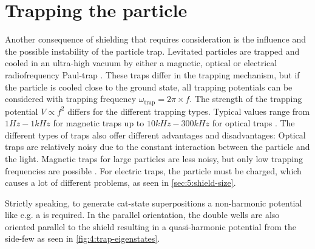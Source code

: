 \section{Trapping the particle}\label{sec:4:trapping}
Another consequence of shielding that requires consideration is the influence and the possible instability of the particle trap. Levitated particles are trapped and cooled in an ultra-high vacuum by either a magnetic, optical or electrical radiofrequency Paul-trap \cite{GonzalezBallestero_2021}.
These traps differ in the trapping mechanism, but if the particle is cooled close to the ground state, all trapping potentials can be considered  with trapping frequency $\omega_\mathrm{trap} = 2\pi \times f$.
The strength of the trapping potential $V \propto f^2$ differs for the different trapping types. Typical values range from $1\si{Hz}-1\si{kHz}$ for magnetic traps \cite{Slezak_2018,GonzalezBallestero_2021} up to $10\si{kHz}-300\si{kHz}$ for optical traps \cite{GonzalezBallestero_2021}. 
The different types of traps also offer different advantages and disadvantages: Optical traps are relatively noisy due to the constant interaction between the particle and the light. Magnetic traps for large particles are less noisy, but only low trapping frequencies are possible \cite{GonzalezBallestero_2021}. 
For electric traps, the particle must be charged, which causes a lot of different problems, as seen in \cref{sec:5:shield-size}.

Strictly speaking, to generate cat-state superpositions a non-harmonic potential like e.g. a  is required. In the parallel orientation, the double wells are also oriented parallel to the shield resulting in a quasi-harmonic potential from the side-few as seen in \cref{fig:4:trap-eigenstates}.

